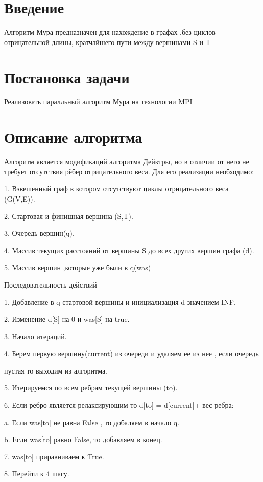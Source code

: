 \documentclass{report}
\begin{document}
\setcounter{page}{2}

\tableofcontents
\newpage

\section*{Введение}
\par Алгоритм Мура предназначен для нахождение в графах ,без циклов отрицательной длины, кратчайшего пути между вершинами S и T
\newpage

\section*{Постановка задачи}
\par Реализовать паралльный алгоритм Мура на технологии MPI
\newpage

\section*{Описание алгоритма}
\par 
Алгоритм является модификаций алгоритма Дейктры, но в отличии от него не требует
отсутствия рёбер отрицательного веса.
Для его реализации необходимо:
\par 1. Взвешенный граф в котором отсутствуют циклы отрицательного веса (G(V,E)).
\par 2. Стартовая и финишная вершина (S,T).
\par 3. Очередь вершин(q).
\par 4. Массив текущих расстояний от вершины S до всех других вершин графа (d).
\par 5. Массив вершин ,которые уже были в q(was)
\par Последовательность действий
\par 1. Добавление в q стартовой вершины и инициализация d значением INF.
\par 2. Изменение d[S] на 0 и was[S] на true.
\par 3. Начало итераций.
\par 4. Берем первую вершину(current) из очереди и удаляем ее из нее , если очередь
\par пустая то выходим из алгоритма.
\par 5. Итерируемся по всем ребрам текущей вершины (to).
\par 6. Если ребро является релаксирующим то d[to] = d[current]+ вес ребра:
\par a. Если was[to] не равна False , то добаляем в начало q.
\par b. Если was[to] равно False, то добавляем в конец.
\par 7. was[to] приравниваем к True.
\par 8. Перейти к 4 шагу.
\newpage
\end{document}
